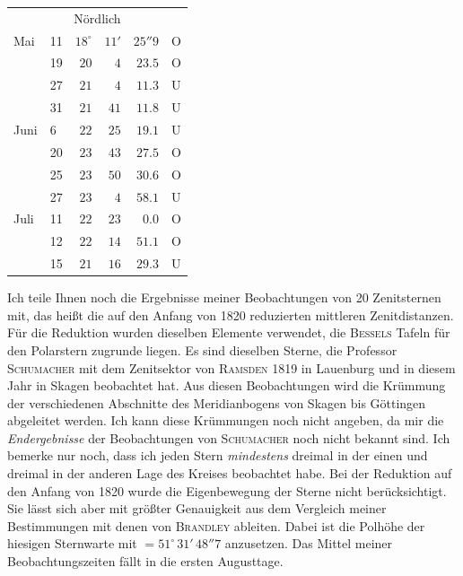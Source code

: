 \begin{center}
\begin{tabular}{ll|r r r l}
\multicolumn{6}{c}{Nördlich} \\
Mai & 11 & $18^\circ$ & $11'$ & $25''9$ & O \\
 & 19 & $20$ & $4$ & $23.5$ & O \\
 & 27 & $21$ & $4$ & $11.3$ & U \\
 & 31 & $21$ & $41$ & $11.8$ & U \\
Juni & 6 & $22$ & $25$ & $19.1$ & U \\
 & 20 & $23$ & $43$ & $27.5$ & O \\
 & 25 & $23$ & $50$ & $30.6$ & O \\
 & 27 & $23$ & $4$ & $58.1$ & U \\
Juli & 11 & $22$ & $23$ & $0.0$ & O \\
 & 12 & $22$ & $14$ & $51.1$ & O \\
 & 15 & $21$ & $16$ & $29.3$ & U \\
\end{tabular}
\end{center}

Ich teile Ihnen noch die Ergebnisse meiner Beobachtungen von 20 Zenitsternen mit, das heißt die auf den Anfang von 1820 reduzierten mittleren Zenitdistanzen. Für die Reduktion wurden dieselben Elemente verwendet, die \textsc{Bessels} Tafeln für den Polarstern zugrunde liegen. Es sind dieselben Sterne, die Professor \textsc{Schumacher} mit dem Zenitsektor von \textsc{Ramsden} 1819 in Lauenburg und in diesem Jahr in Skagen beobachtet hat. Aus diesen Beobachtungen wird die Krümmung der verschiedenen Abschnitte des Meridianbogens von Skagen bis Göttingen abgeleitet werden. Ich kann diese Krümmungen noch nicht angeben, da mir die \emph{Endergebnisse} der Beobachtungen von \textsc{Schumacher} noch nicht bekannt sind. Ich bemerke nur noch, dass ich jeden Stern \emph{mindestens} dreimal in der einen und dreimal in der anderen Lage des Kreises beobachtet habe. Bei der Reduktion auf den Anfang von 1820 wurde die Eigenbewegung der Sterne nicht berücksichtigt. Sie lässt sich aber mit größter Genauigkeit aus dem Vergleich meiner Bestimmungen mit denen von \textsc{Brandley} ableiten. Dabei ist die Polhöhe der hiesigen Sternwarte mit $=51^\circ\,31'\,48''7$ anzusetzen. Das Mittel meiner Beobachtungszeiten fällt in die ersten Augusttage.

